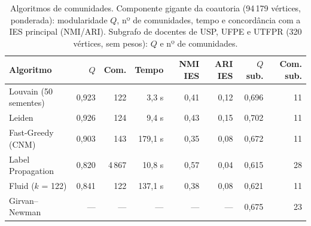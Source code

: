 \begin{table}[htbp]
\centering
\small
\caption{Algoritmos de comunidades. Componente gigante da coautoria (94\,179 vértices, ponderada): modularidade $Q$, nº de comunidades, tempo e concordância com a IES principal (NMI/ARI). Subgrafo de docentes de USP, UFPE e UTFPR (320 vértices, sem pesos): $Q$ e nº de comunidades.}
\label{tab:algoritmos}
\begin{tabular}{lrrrrrrr}
\hline
Algoritmo & $Q$ & Com. & Tempo & NMI IES & ARI IES & $Q$ sub. & Com. sub. \\
\hline
Louvain (50 sementes) & 0{,}923 & 122 & 3{,}3 s & 0{,}41 & 0{,}12 & 0{,}696 & 11 \\
Leiden & 0{,}926 & 124 & 9{,}4 s & 0{,}43 & 0{,}15 & 0{,}702 & 11 \\
Fast-Greedy (CNM) & 0{,}903 & 143 & 179{,}1 s & 0{,}35 & 0{,}08 & 0{,}672 & 11 \\
Label Propagation & 0{,}820 & 4\,867 & 10{,}8 s & 0{,}57 & 0{,}04 & 0{,}615 & 28 \\
Fluid ($k$ = 122) & 0{,}841 & 122 & 137{,}1 s & 0{,}38 & 0{,}08 & 0{,}621 & 11 \\
Girvan--Newman & --- & --- & --- & --- & --- & 0{,}675 & 23 \\
\hline
\end{tabular}
\end{table}
